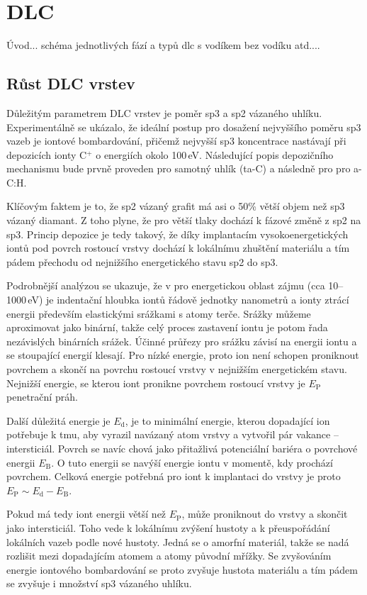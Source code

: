 \chapter{DLC}

Úvod... schéma jednotlivých fází a typů dlc s vodíkem bez vodíku atd....

\section{Růst DLC vrstev}
Důležitým parametrem DLC vrstev je poměr sp3 a sp2 vázaného uhlíku. Experimentálně se ukázalo, že ideální postup pro dosažení nejvyššího poměru sp3 vazeb je iontové bombardování, přičemž nejvyšší sp3 koncentrace nastávají při depozicích ionty C$^+$ o energiích okolo 100\,eV. Následující popis depozičního mechanismu bude prvně proveden pro samotný uhlík (ta-C) a následně pro pro a-C:H.

Klíčovým faktem je to, že sp2 vázaný grafit má asi o 50\% větší objem než sp3 vázaný diamant. Z toho plyne, že pro větší tlaky dochází k fázové změně z sp2 na sp3. Princip depozice je tedy takový, že díky implantacím vysokoenergetických iontů pod povrch rostoucí vrstvy dochází k lokálnímu zhuštění materiálu a tím pádem přechodu od nejnižšího energetického stavu sp2 do sp3.

Podrobnější analýzou se ukazuje, že v pro energetickou oblast zájmu (cca 10--1000\,eV) je indentační hloubka iontů řádově jednotky nanometrů a ionty ztrácí energii především elastickými srážkami s atomy terče. Srážky můžeme aproximovat jako binární, takže celý proces zastavení iontu je potom řada nezávislých binárních srážek. Účinné průřezy pro srážku závisí na energii iontu a se stoupající energií klesají. Pro nízké energie, proto ion není schopen proniknout povrchem a skončí na povrchu rostoucí vrstvy v nejnižším energetickém stavu. Nejnižší energie, se kterou iont pronikne povrchem rostoucí vrstvy je $E_\mathrm{P}$ penetrační práh. 

Další důležitá energie je $E_\mathrm{d}$, je to minimální energie, kterou dopadající ion potřebuje k tmu, aby vyrazil navázaný atom vrstvy a vytvořil pár vakance -- intersticiál. Povrch se navíc chová jako přitažlivá potenciální bariéra o povrchové energii $E_\mathrm{B}$. O tuto energii se navýší energie iontu v momentě, kdy prochází povrchem. Celková energie potřebná pro iont k implantaci do vrstvy je proto $E_\mathrm{P} \sim E_\mathrm{d} - E_\mathrm{B}$. 

Pokud má tedy iont energii větší než $E_\mathrm{P}$, může proniknout do vrstvy a skončit jako intersticiál. Toho vede k lokálnímu zvýšení hustoty a k přeuspořádání lokálních vazeb podle nové hustoty. Jedná se o amorfní materiál, takže se nadá rozlišit mezi dopadajícím atomem a atomy původní mřížky. Se zvyšováním energie iontového bombardování se proto zvyšuje hustota materiálu a tím pádem se zvyšuje i množství sp3 vázaného uhlíku.

